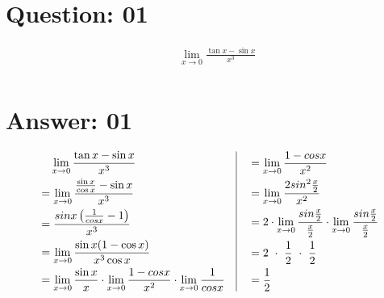 \documentclass[17pt]{extarticle}
\begin{document}
\noindent

\begin{fleqn} 


\section{Question: 01}

\begin{equation} \nonumber
\begin{alignedat}{4}
& \texttt{\ \ }  \lim_{x \to 0} \frac{\tan{x} - \sin{x}}{x^3}\\
\end{alignedat}
\end{equation}



\section{Answer: 01}

\begin{equation} \nonumber
\begin{alignedat}{4}
& \texttt{\ \ } \lim_{x \to 0} \frac{\tan{x} - \sin{x}}{x^3}\\
&= \lim_{x \to 0} \frac{\frac{\sin{x}}{\cos{x}}-\sin{x}}{x^3}\\
&= \frac{sin x\left(\frac{1}{cos x} - 1\right)}{x^3}\\
&= \lim_{x \to 0} \frac{\sin{x}(1  - \cos{x})}{x^3\cos{x}}\\
&= \lim_{x \to 0} \frac{\sin{x}}{x}\cdot\lim_{x \to 0} \frac{1 - cos x}{x^2}\cdot\lim_{x \to 0}\frac{1}{cos x}\\
\end{alignedat}
\quad
\vrule
\quad
\begin{alignedat}{4}
&= \lim_{x \to 0} \frac{1 - cos x}{x^2}\\
&= \lim_{x \to 0} \frac{2sin^2\frac{x}{2}}{x^2}\\
&= 2\cdot\lim_{x \to 0} \frac{sin\frac{x}{2}}{\frac{x}{2}}\cdot\lim_{x \to 0} \frac{sin\frac{x}{2}}{\frac{x}{2}}\\
&= 2\ \cdot\ \frac{1}{2}\ \cdot\ \frac{1}{2}\\
&= \frac{1}{2}
\end{alignedat}
\end{equation}



\end{fleqn}
\end{document}
